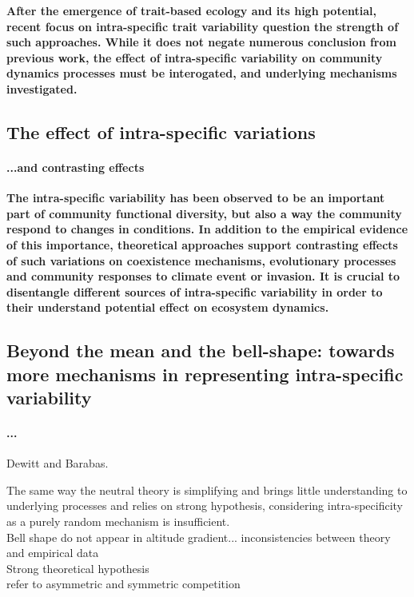 \textbf{After the emergence of trait-based ecology and its high potential, recent focus on intra-specific trait variability question the strength of such approaches. While it does not negate numerous conclusion from previous work, the effect of intra-specific variability on community dynamics processes must be interogated, and underlying mechanisms investigated.}

\subsection{The effect of intra-specific variations}

\paragraph{...and contrasting effects}

\parencite{hart_how_2016}
\parencite{courbaud_intra-specific_2010}
\parencite{turcotte_phenotypic_2016}
\parencite{roscher_contrasting_2015}
\parencite{valladares_species_2015}
\parencite{barabas_effect_2016}
\parencite{jung_intraspecific_2010}


\textbf{The intra-specific variability has been observed to be an important part of community functional diversity, but also a way the community respond to changes in conditions. In addition to the empirical evidence of this importance, theoretical approaches support contrasting effects of such variations on coexistence mechanisms, evolutionary processes and community responses to climate event or invasion. It is crucial to disentangle different sources of intra-specific variability in order to their understand potential effect on ecosystem dynamics.}

\subsection{Beyond the mean and the bell-shape: towards more mechanisms in representing intra-specific variability}

\paragraph{...}
Dewitt and Barabas.

The same way the neutral theory is simplifying and brings little understanding to underlying processes and relies on strong hypothesis, considering intra-specificity as a purely random mechanism is insufficient.\\
Bell shape do not appear in altitude gradient... inconsistencies between theory and empirical data\\
Strong theoretical hypothesis\\
refer to asymmetric and symmetric competition\\

